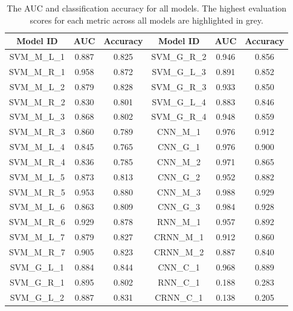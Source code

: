 \begin{table}[ht]
\begin{center}
\begin{tabular}{c c c|c c c}
\toprule
Model ID & AUC & Accuracy & Model ID & AUC & Accuracy \\ [0.5ex]
\midrule
SVM\_M\_L\_1 & 0.887 & 0.825 & SVM\_G\_R\_2 & 0.946 & 0.856 \\
SVM\_M\_R\_1 & 0.958 & 0.872 & SVM\_G\_L\_3 & 0.891 & 0.852 \\
SVM\_M\_L\_2 & 0.879 & 0.828 & SVM\_G\_R\_3 & 0.933 & 0.850 \\
SVM\_M\_R\_2 & 0.830 & 0.801 & SVM\_G\_L\_4 & 0.883 & 0.846 \\
SVM\_M\_L\_3 & 0.868 & 0.802 & SVM\_G\_R\_4 & 0.948 & 0.859 \\
SVM\_M\_R\_3 & 0.860 & 0.789 & CNN\_M\_1 & 0.976 & 0.912 \\
SVM\_M\_L\_4 & 0.845 & 0.765 & CNN\_G\_1 & 0.976 & 0.900 \\
SVM\_M\_R\_4 & 0.836 & 0.785 & CNN\_M\_2 & 0.971 & 0.865 \\
SVM\_M\_L\_5 & 0.873 & 0.813 & CNN\_G\_2 & 0.952 & 0.882 \\
SVM\_M\_R\_5 & 0.953 & 0.880 & CNN\_M\_3 & \cellcolor{lightgray} 0.988 & \cellcolor{lightgray} 0.929 \\
SVM\_M\_L\_6 & 0.863 & 0.809 & CNN\_G\_3 & 0.984 & 0.928 \\
SVM\_M\_R\_6 & 0.929 & 0.878 & RNN\_M\_1 & 0.957 & 0.892 \\
SVM\_M\_L\_7 & 0.879 & 0.827 & CRNN\_M\_1 & 0.912 & 0.860 \\
SVM\_M\_R\_7 & 0.905 & 0.823 & CRNN\_M\_2 & 0.887 & 0.840 \\
SVM\_G\_L\_1 & 0.884 & 0.844 & CNN\_C\_1 & 0.968 & 0.889 \\
SVM\_G\_R\_1 & 0.895 & 0.802 & RNN\_C\_1 & 0.188 & 0.283 \\
SVM\_G\_L\_2 & 0.887 & 0.831 & CRNN\_C\_1 & 0.138 & 0.205 \\
\bottomrule
\end{tabular}
\caption{The AUC and classification accuracy for all models. The highest
evaluation scores for each metric across all models are highlighted in
grey.}\label{table:all_results}
\end{center}
\end{table}

